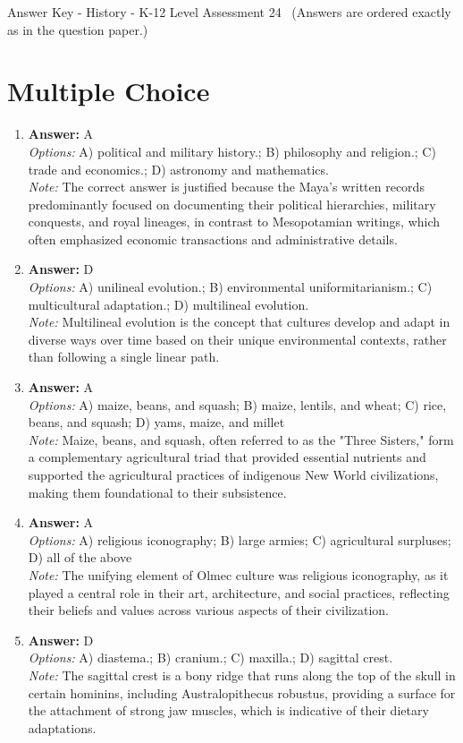 \documentclass[12pt]{article}
\begin{document}
\begin{center}
Answer Key - History - K-12 Level Assessment 24 \
\small (Answers are ordered exactly as in the question paper.)
\end{center}

\section*{Multiple Choice}
\begin{enumerate}[label=\arabic*.]
\item \textbf{Answer:} A
\\ \textit{Options:} A) political and military history.; B) philosophy and religion.; C) trade and economics.; D) astronomy and mathematics.
\\ \textit{Note:} The correct answer is justified because the Maya's written records predominantly focused on documenting their political hierarchies, military conquests, and royal lineages, in contrast to Mesopotamian writings, which often emphasized economic transactions and administrative details.
\item \textbf{Answer:} D
\\ \textit{Options:} A) unilineal evolution.; B) environmental uniformitarianism.; C) multicultural adaptation.; D) multilineal evolution.
\\ \textit{Note:} Multilineal evolution is the concept that cultures develop and adapt in diverse ways over time based on their unique environmental contexts, rather than following a single linear path.
\item \textbf{Answer:} A
\\ \textit{Options:} A) maize, beans, and squash; B) maize, lentils, and wheat; C) rice, beans, and squash; D) yams, maize, and millet
\\ \textit{Note:} Maize, beans, and squash, often referred to as the "Three Sisters," form a complementary agricultural triad that provided essential nutrients and supported the agricultural practices of indigenous New World civilizations, making them foundational to their subsistence.
\item \textbf{Answer:} A
\\ \textit{Options:} A) religious iconography; B) large armies; C) agricultural surpluses; D) all of the above
\\ \textit{Note:} The unifying element of Olmec culture was religious iconography, as it played a central role in their art, architecture, and social practices, reflecting their beliefs and values across various aspects of their civilization.
\item \textbf{Answer:} D
\\ \textit{Options:} A) diastema.; B) cranium.; C) maxilla.; D) sagittal crest.
\\ \textit{Note:} The sagittal crest is a bony ridge that runs along the top of the skull in certain hominins, including Australopithecus robustus, providing a surface for the attachment of strong jaw muscles, which is indicative of their dietary adaptations.
\end{enumerate}
\end{document}
